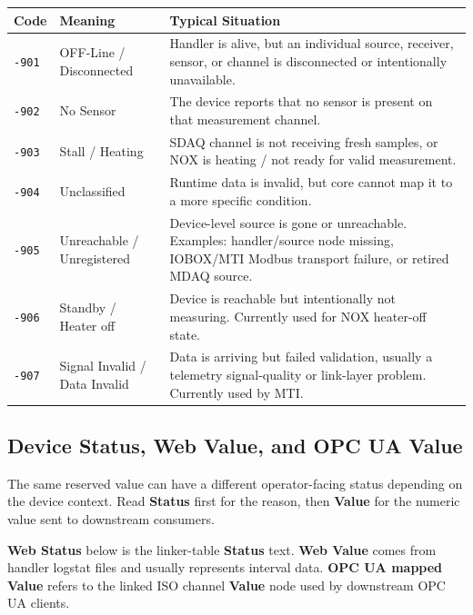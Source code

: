 \documentclass[11pt,a4paper]{article}
\begin{document}
\begin{longtable}{|p{}|p{}|p{}|}
\hline
\textbf{Code} & \textbf{Meaning} & \textbf{Typical Situation} \\
\hline
\texttt{-901} & OFF-Line / Disconnected & Handler is alive, but an individual source, receiver, sensor, or channel is disconnected or intentionally unavailable. \\
\hline
\texttt{-902} & No Sensor & The device reports that no sensor is present on that measurement channel. \\
\hline
\texttt{-903} & Stall / Heating & SDAQ channel is not receiving fresh samples, or NOX is heating / not ready for valid measurement. \\
\hline
\texttt{-904} & Unclassified & Runtime data is invalid, but core cannot map it to a more specific condition. \\
\hline
\texttt{-905} & Unreachable / Unregistered & Device-level source is gone or unreachable. Examples: handler/source node missing, IOBOX/MTI Modbus transport failure, or retired MDAQ source. \\
\hline
\texttt{-906} & Standby / Heater off & Device is reachable but intentionally not measuring. Currently used for NOX heater-off state. \\
\hline
\texttt{-907} & Signal Invalid / Data Invalid & Data is arriving but failed validation, usually a telemetry signal-quality or link-layer problem. Currently used by MTI. \\
\hline
\end{longtable}

\subsection{Device Status, Web Value, and OPC UA Value}
The same reserved value can have a different operator-facing status depending on the device context. Read \textbf{Status} first for the reason, then \textbf{Value} for the numeric value sent to downstream consumers.

\textbf{Web Status} below is the linker-table \textbf{Status} text. \textbf{Web Value} comes from handler logstat files and usually represents interval data. \textbf{OPC UA mapped Value} refers to the linked ISO channel \textbf{Value} node used by downstream OPC UA clients.
\end{document}
